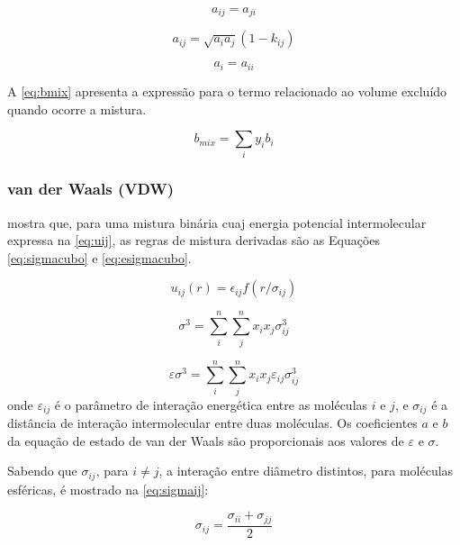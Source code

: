\begin{equation}\label{eq:aij2}
a_{ij} = a_{ji}
\end{equation}

\begin{equation}\label{eq:aij3}
a_{ij} = \sqrt{a_ia_j}(1 - k_{ij})
\end{equation}

\begin{equation}\label{eq:aij4}
a_{i} = a_{ii}
\end{equation}

A \autoref{eq:bmix} apresenta a expressão para o termo relacionado ao volume
excluído quando ocorre a mistura.

\begin{equation}\label{eq:bmix}
b_{mix} = \sum_iy_ib_i
\end{equation}

\subsubsection{van der Waals (VDW)}
 mostra que, para uma mistura binária cuaj energia potencial
intermolecular expressa na \autoref{eq:uij}, as regras de mistura derivadas são 
as Equações \ref{eq:sigmacubo} e \ref{eq:esigmacubo}.

\begin{equation}\label{eq:uij}
u_{ij}(r) = \epsilon_{ij}f(r/\sigma_{ij})
\end{equation}

\begin{equation}\label{eq:sigmacubo}
\sigma^3 = \sum_i^n\sum_j^nx_ix_j\sigma_{ij}^3
\end{equation}

\begin{equation}\label{eq:esigmacubo}
\varepsilon\sigma^3 = \sum_i^n\sum_j^nx_ix_j\varepsilon_{ij}\sigma_{ij}^3
\end{equation}
onde $\varepsilon_{ij}$ é o parâmetro de interação energética entre as moléculas
$i$ e $j$, e $\sigma_{ij}$ é a distância de interação intermolecular entre duas
moléculas. Os coeficientes $a$ e $b$ da equação de estado de van der Waals são
proporcionais aos valores de $\varepsilon$ e $\sigma$.

Sabendo que $\sigma_{ij}$, para $i \neq j$, a interação entre diâmetro
distintos, para moléculas esféricas, é mostrado na \autoref{eq:sigmaij}:

\begin{equation}\label{eq:sigmaij}
\sigma_{ij} = \frac{\sigma_{ii} + \sigma_{jj}}{2}
\end{equation}

